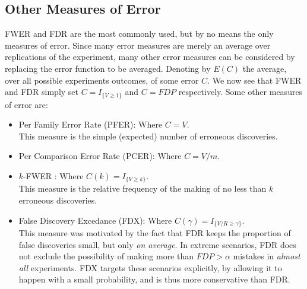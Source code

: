 \documentclass[review,12pt]{article}
\theoremstyle{definition}
\begin{document}
\subsection{\label{sec:other_measures}Other Measures of Error}
FWER and FDR are the most commonly used, but by no means the only measures of error. Since many error measures are merely an average over replications of the experiment, many other error measures can be considered by replacing the error function to be averaged. Denoting by $E(C)$ the average, over all possible experiments outcomes, of some error $C$. We now see that FWER and FDR simply set  $C = I_{\{ V \geq 1 \} } $ and $C = FDP$ respectively.
Some other measures of error are:



\begin{itemize}

\item Per Family Error Rate (PFER): Where $C=V$.\\
This measure is the simple (expected) number of erroneous discoveries. 

\item Per Comparison Error Rate (PCER): Where $C=V/m$.

\item $k$-FWER \citep{van_der_laan_augmentation_2004}: Where $C(k) = I_{\{ V \geq k \} }$.\\
This measure is the relative frequency of the making of no less than $k$ erroneous discoveries.

\item False Discovery Excedance (FDX)\citep{genovese_exceedance_2006}: Where $C(\gamma) = I_{\{ V/R \geq \gamma \} }$.\\
This measure was motivated by the fact that FDR keeps the proportion of false discoveries small, but only \emph{on average}. 
In extreme scenarios, FDR does not exclude the possibility of making more than $FDP>\alpha$ mistakes in \emph{almost all} experiments. FDX targets these scenarios explicitly, by allowing it to happen with a small probability, and is thus more conservative than FDR. 

\end{itemize}
\end{document}
